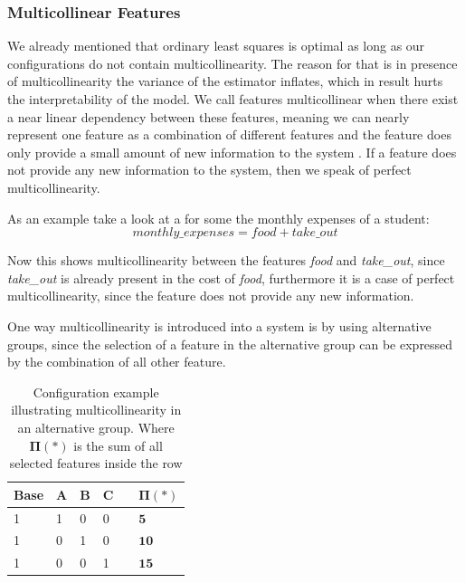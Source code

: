 \subsubsection{Multicollinear Features}\label{ColinearF}
We already mentioned that ordinary least squares is optimal as long as our configurations do not contain multicollinearity. The reason for that
is in presence of multicollinearity the variance of the estimator inflates, which in result hurts the interpretability of the model.
We call features multicollinear when there exist a near linear dependency between these features, meaning we can nearly represent one feature as a combination
of different features and the feature does only provide a small amount of new information to the system \cite{Linear-Regression}. If a feature does not provide
any new information to the system, then we speak of perfect multicollinearity.

As an example take a look at a {\perfInfluenceModel} for some the monthly expenses of a student:
\begin{equation*}
    monthly\_expenses = \textit{food} + \textit{take\_out}
\end{equation*}

Now this shows multicollinearity between the features \textit{food} and \textit{take\_out}, since \textit{take\_out} is already present in the cost of \textit{food},
furthermore it is a case of perfect multicollinearity, since the feature does not provide any new information.

One way multicollinearity is introduced into a system is by using alternative groups, since the selection of a feature in the
alternative group can be expressed by the combination of all other feature. \cite{Multicollinearity}

\begin{table}[h]
    \centering
    \begin{tabular}{llllll}
    \hline
    Base & A & B & C &  & $\bm{\Pi(*)}$ \\ \hline
    1 & 1 & 0 & 0 &  & $\mathbf{5}$  \\
    1 & 0 & 1 & 0 &  & $\mathbf{10}$  \\  
    1 & 0 & 0 & 1 &  & $\mathbf{15}$  \\\hline
    \end{tabular}  
    \caption{Configuration example illustrating multicollinearity in an alternative group.
    Where $\bm{\Pi(*)}$ is the sum of all selected features inside the row}\label{tab:alternative}
\end{table}

